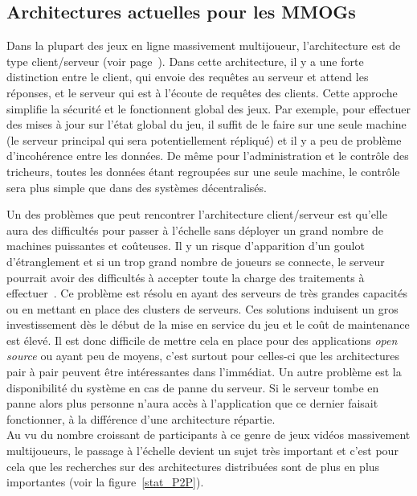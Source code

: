 	\subsection{Architectures actuelles pour les MMOGs}
	\par Dans la plupart des jeux en ligne massivement multijoueur, l'architecture est de type client/serveur (voir page~\pageref{P2P/ClServ}). Dans cette architecture, il y a une forte distinction entre le client, qui envoie des requêtes au serveur et attend les réponses, et le serveur qui est à l'écoute de requêtes des clients. Cette approche simplifie la sécurité et le fonctionnent global des jeux. Par exemple, pour effectuer des mises à jour sur l'état global du jeu, il suffit de le faire sur une seule machine (le serveur principal qui sera potentiellement répliqué) et il y a peu de problème d'incohérence entre les données. De même pour l'administration et le contrôle des tricheurs, toutes les données étant regroupées sur une seule machine, le contrôle sera plus simple que dans des systèmes décentralisés. \\
	\par Un des problèmes que peut rencontrer l'architecture client/serveur est qu'elle aura des difficultés pour passer à l'échelle sans déployer un grand nombre de machines puissantes et coûteuses. Il y un risque d'apparition d'un goulot d'étranglement et si un trop grand nombre de joueurs se connecte, le serveur pourrait avoir des difficultés à accepter toute la charge des traitements à effectuer~\cite{1198269}. Ce problème est résolu en ayant des serveurs de très grandes capacités ou en mettant en place des clusters de serveurs. Ces solutions induisent un gros investissement dès le début de la mise en service du jeu et le coût de maintenance est élevé. Il est donc difficile de mettre cela en place pour des applications \textit{open source} ou ayant peu de moyens, c'est surtout pour celles-ci que les architectures pair à pair peuvent être intéressantes dans l'immédiat. Un autre problème est la disponibilité du système en cas de panne du serveur. Si le serveur tombe en panne alors plus personne n'aura accès à l'application que ce dernier faisait fonctionner, à la différence d'une architecture répartie. \\
	Au vu du nombre croissant de participants à ce genre de jeux vidéos massivement multijoueurs, le passage à l'échelle devient un sujet très important et c'est pour cela que les recherches sur des architectures distribuées sont de plus en plus importantes (voir la figure~\ref{stat_P2P}). \\
